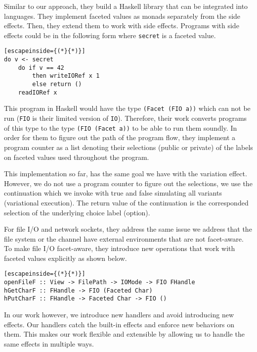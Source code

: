 Similar to our approach, they build a Haskell library that can be integrated into languages. They implement faceted values as monads separately from the side effects. Then, they extend them to work with side effects. Programs with side effects could be in the following form where \texttt{secret} is a faceted value. 
%
\begin{lstlisting}[escapeinside={(*}{*)}]
do v <- secret 
    do if v == 42 
        then writeIORef x 1
        else return ()
    readIORef x

\end{lstlisting}
%
This program in Haskell would have the type \texttt{(Facet (FIO a))} which can not be run (\texttt{FIO} is their limited version of \texttt{IO}). Therefore, their work converts programs of this type to the type \texttt{(FIO (Facet a))} to be able to run them soundly. In order for them to figure out the path of the program flow, they implement a program counter as a list denoting their selections (public or private) of the labels on faceted values used throughout the program. 

This implementation so far, has the same goal we have with the variation effect. However, we do not use a program counter to figure out the selections, we use the continuation which we invoke with true and false simulating all variants (variational execution). The return value of the continuation is the corresponded selection of the underlying choice label (option). 


For file I/O and network sockets, they address the same issue we address that the file system or the channel have external environments that are not facet-aware. To make file I/O facet-aware, they introduce new operations that work with faceted values explicitly as shown below. 
%
\begin{lstlisting}[escapeinside={(*}{*)}]
openFileF :: View -> FilePath -> IOMode -> FIO FHandle
hGetCharF :: FHandle -> FIO (Faceted Char)
hPutCharF :: FHandle -> Faceted Char -> FIO ()
\end{lstlisting}
%
In our work however, we introduce new handlers and avoid introducing new effects. Our handlers catch the built-in effects and enforce new behaviors on them. This makes our work flexible and extensible by allowing us to handle the same effects in multiple ways. 

